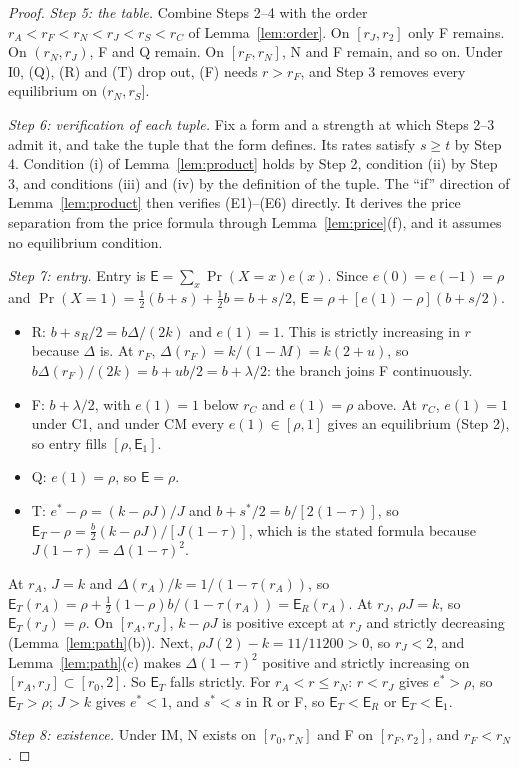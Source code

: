 \documentclass[11pt]{article}
\theoremstyle{definition}
\newcommand{\Ent}{\mathsf E}
\begin{document}
\begin{proof}
\emph{Step 5: the table.} Combine Steps 2--4 with the order $r_A<r_F<r_N<r_J<r_S<r_C$ of Lemma~\ref{lem:order}.
On $[r_J,r_2]$ only F remains. On $(r_N,r_J)$, F and Q remain. On $[r_F,r_N]$, N and F remain, and so on. Under I0,
(Q), (R) and (T) drop out, (F) needs $r>r_F$, and Step 3 removes every equilibrium on $(r_N,r_S]$.

\emph{Step 6: verification of each tuple.} Fix a form and a strength at which Steps 2--3 admit it, and take the
tuple that the form defines. Its rates satisfy $s\ge t$ by Step 4. Condition (i) of Lemma~\ref{lem:product} holds by
Step 2, condition (ii) by Step 3, and conditions (iii) and (iv) by the definition of the tuple. The ``if'' direction
of Lemma~\ref{lem:product} then verifies (E1)--(E6) directly. It derives the price separation from the price
formula through Lemma~\ref{lem:price}(f), and it assumes no equilibrium condition.

\emph{Step 7: entry.} Entry is $\Ent=\sum_x\Pr(X=x)e(x)$. Since $e(0)=e(-1)=\rho$ and
$\Pr(X=1)=\tfrac12(b+s)+\tfrac12b=b+s/2$, $\Ent=\rho+[e(1)-\rho](b+s/2)$.
\begin{itemize}
\item R: $b+s_R/2=b\Delta/(2k)$ and $e(1)=1$. This is strictly increasing in $r$ because $\Delta$ is. At $r_F$,
  $\Delta(r_F)=k/(1-M)=k(2+u)$, so $b\Delta(r_F)/(2k)=b+ub/2=b+\lambda/2$: the branch joins F continuously.
\item F: $b+\lambda/2$, with $e(1)=1$ below $r_C$ and $e(1)=\rho$ above. At $r_C$, $e(1)=1$ under C1, and
  under CM every $e(1)\in[\rho,1]$ gives an equilibrium (Step 2), so entry fills $[\rho,\Ent_1]$.
\item Q: $e(1)=\rho$, so $\Ent=\rho$.
\item T: $e^*-\rho=(k-\rho J)/J$ and $b+s^*/2=b/[2(1-\tau)]$, so $\Ent_T-\rho=\tfrac b2(k-\rho J)/[J(1-\tau)]$,
  which is the stated formula because $J(1-\tau)=\Delta(1-\tau)^2$.
\end{itemize}
At $r_A$, $J=k$ and $\Delta(r_A)/k=1/(1-\tau(r_A))$, so $\Ent_T(r_A)=\rho+\tfrac12(1-\rho)b/(1-\tau(r_A))=\Ent_R(r_A)$.
At $r_J$, $\rho J=k$, so $\Ent_T(r_J)=\rho$. On $[r_A,r_J]$, $k-\rho J$ is positive except at $r_J$ and strictly
decreasing (Lemma~\ref{lem:path}(b)). Next, $\rho J(2)-k=11/11200>0$, so $r_J<2$, and
Lemma~\ref{lem:path}(c) makes $\Delta(1-\tau)^2$ positive and strictly increasing on $[r_A,r_J]\subset[r_0,2]$.
So $\Ent_T$ falls strictly. For $r_A<r\le r_N$: $r<r_J$ gives $e^*>\rho$, so
$\Ent_T>\rho$; $J>k$ gives $e^*<1$, and $s^*<s$ in R or F, so $\Ent_T<\Ent_R$ or $\Ent_T<\Ent_1$.

\emph{Step 8: existence.} Under IM, N exists on $[r_0,r_N]$ and F on $[r_F,r_2]$, and $r_F<r_N$.
\end{proof}
\end{document}
